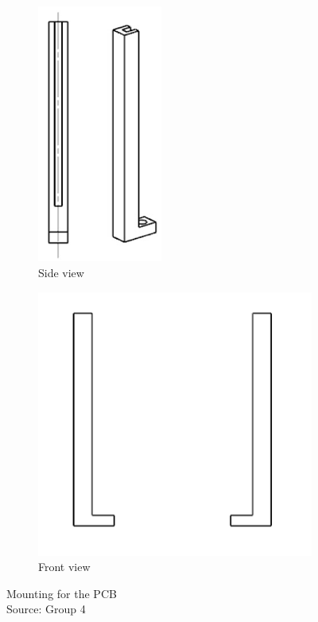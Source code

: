 \documentclass[a4paper,12pt]{scrreprt}
\begin{document}
  \begin{figure} [H]
        \centering
        \begin{subfigure}[b]{0.45\textwidth}
                \centering
                \includegraphics[width=0.45\textwidth]{pictures/pcb_mounting_1}
                \caption{Side view}\label{fig:pcb_mounting_2}
        \end{subfigure}%
                \begin{subfigure}[b]{0.45\textwidth}
                \centering
                \includegraphics[width=1\textwidth]{pictures/pcb_mounting_3}
                \caption{Front view}\label{fig:pcb_mounting_3}
        \end{subfigure}
        \caption[Mounting for the \acs{PCB}]{Mounting for the \acs{PCB}\\
        Source: Group 4}\label{fig:pcb_mounting}
  \end{figure}     
  
\end{document}
